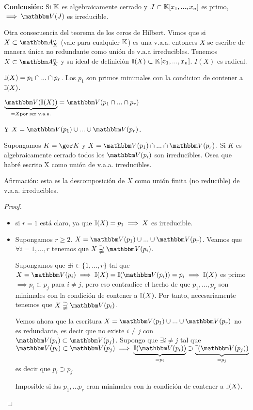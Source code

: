 \textbf{Conlcusión:} Si $\mathbb{K}$ es algebraicamente cerrado y $J\subset \mathbb{K}[x_1,...,x_n]$ es primo, $\implies \V(J)$ es irreducible.

Otra consecuencia del teorema de los ceros de Hilbert.
Vimos que si $X \subset \Akn$ (vale para cualquier $\mathbb{K}$) es una v.a.a. entonces $X$ se escribe de manera única no redundante como unión de v.a.a irreducibles.
Tenemos $X \subset \Akn$ y su ideal de definición $\mathbb{I}(X) \subset \mathbb{K}[x_1,...,x_n]$. $I(X)$ es radical.

$\mathbb{I}(X)=p_1 \cap ... \cap p_r$. Los $p_1$ son primos minimales con la condicion de contener a $\mathbb{I}(X)$.

$\underbrace{\V(\I(X))}_{=X \text{por ser v.a.a.}}=\V(p_1\cap...\cap p_r)$

Y $X=\V(p_1)\cup...\cup\V(p_r)$.

Supongamos $K=\cls{K}$ y $X=\V(p_1)\cap...\cap\V(p_r)$. Si $K$ es algebraicamente cerrado todos los $\V(p_i)$ son irreducibles. Osea que habré escrito X como unión de v.a.a. irreducibles.

Afirmación: esta es la descomposición de $X$ como unión finita (no reducible) de v.a.a. irreducibles.

\begin{proof}
	\begin{itemize}
		\item si $r=1$ está claro, ya que $\mathbb{I}(X)=p_1 \implies X$ es irreducible.
		\item Supongamos $r \geq 2$. $X=\V(p_1)\cup...\cup \V(p_r)$. Veamos que $\forall i=1,...,r$ tenemos que $X \supsetneqq \V(p_i)$.

		Supongamos que $\exists i \in \{1,...,r\}$ tal que $X=\V(p_i)\implies \I(X)=\I(\V(p_i))=p_i \implies \I(X)$ es primo $\implies p_i \subset p_j$ para $i \neq j$, pero eso contradice el hecho de que $p_1,...,p_r$ son minimales con la condición de contener a $\mathbb{I}(X)$. Por tanto, necesariamente tenemos que $X \supsetneqq \V(p_i)$.

		Vemos ahora que la escritura $ X=\V(p_1)\cup...\cup\V(p_r) $ no es redundante, es decir que no existe $i \neq j$ con $\V(p_i) \subset \V(p_j)$. Supongo que $\exists i \neq j$ tal que $\V(p_i)\subset \V(p_j) \implies \underbrace{\I(\V(p_i))}_{=p_i} \supset \underbrace{\I(\V(p_j))}_{=p_j}$ es decir que $p_i \supset p_j$

		Imposible si las $p_1,...p_r$ eran minimales con la condición de contener a $\mathbb{I}(X)$.
	\end{itemize}



\end{proof}
